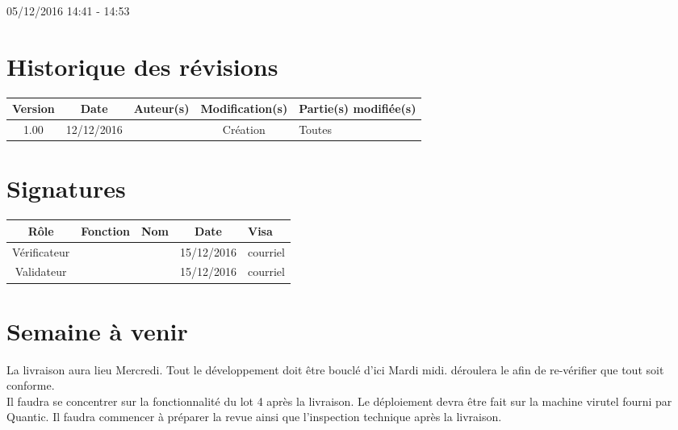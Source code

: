 \documentclass [a4paper] {article}
\begin{document}
05/12/2016			 				%
\hfill   
\hfill 	 14:41 - 14:53				%



\section*{Historique des révisions}
\begin{center}
			\begin{tabular}{| c | c | c | c | p{4cm} |}
				\hline
				\rowcolor{Gray}
				Version & Date & Auteur(s) & Modification(s) & Partie(s) modifiée(s)		 \\
				\hline
				1.00 & 12/12/2016 & \Kafui & Création & Toutes \\
		\hline		
			\end{tabular}
		\end{center}

\section*{Signatures}

		\begin{center}
			\begin{tabular}{| c | c | c | c | p{4cm} |}
				\hline
				\rowcolor{Gray}
				Rôle & Fonction & Nom & Date & Visa		 \\
				\hline
				Vérificateur & \RQ & \Melissa & 15/12/2016 & courriel \\[30pt]
				\hline
				Validateur & \CP & \Pierre & 15/12/2016 & courriel \\[30pt]	
				\hline
			\end{tabular}
		\end{center}

\section{Semaine à venir}
La livraison aura lieu Mercredi. Tout le développement doit être bouclé d'ici Mardi midi. \Pierre{} déroulera le \CDR{} afin de re-vérifier que tout soit conforme.\\
Il faudra se concentrer sur la fonctionnalité du lot 4 après la livraison. Le déploiement devra être fait sur la machine virutel fourni par Quantic. Il faudra commencer à préparer la revue ainsi que l'inspection technique après la livraison.



\end{document}
